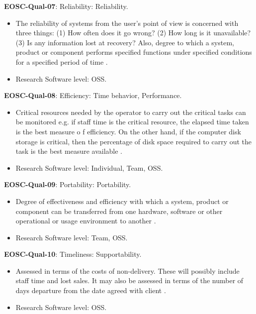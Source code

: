 \textbf{EOSC-Qual-07}: Reliability: Reliability.

\begin{itemize}
    \item The reliability of systems from the user's point of view is concerned with three things: (1) How often does it go wrong? (2) How long is it unavailable? (3) Is any information lost at recovery? Also, degree to which a system, product or component performs specified functions under specified conditions for a specified period of time \cite{iso_25010_2011_2017,gillies_modelling_1992,boehm_quantitative_1976}.
    \item Research Software level: OSS.
\end{itemize}

\textbf{EOSC-Qual-08}: Efficiency: Time behavior, Performance.

\begin{itemize}
    \item Critical resources needed by the operator to carry out the critical tasks can be monitored e.g. if staff time is the critical resource, the elapsed time taken is the best measure o f efficiency. On the other hand, if the computer disk storage is critical, then the percentage of disk space required to carry out the task is the best measure available \cite{iso_25010_2011_2017,gillies_modelling_1992,boehm_quantitative_1976}.
    \item Research Software level: Individual, Team, OSS.
\end{itemize}

\textbf{EOSC-Qual-09}: Portability: Portability.

\begin{itemize}
    \item Degree of effectiveness and efficiency with which a system, product or component can be transferred from one hardware, software or other operational or usage environment to another \cite{iso_25010_2011_2017,gillies_modelling_1992,boehm_quantitative_1976,shepherdson_cessda_2019,raymond_software_2013}.
    \item Research Software level: Team, OSS.
\end{itemize}

\textbf{EOSC-Qual-10}: Timeliness: Supportability.

\begin{itemize}
    \item Assessed in terms of the costs of non-delivery. These will possibly include staff time and lost sales. It may also be assessed in terms of the number of days departure from the date agreed with client \cite{gillies_modelling_1992}.
    \item Research Software level: OSS.
\end{itemize}

